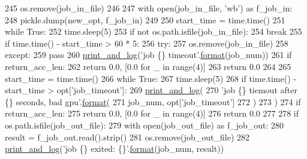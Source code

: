 \begin{DoxyCode}
245         os.remove(job\_in\_file)
246 
247     with open(job\_in\_file, \textcolor{stringliteral}{'wb'}) \textcolor{keyword}{as} f\_job\_in:
248         pickle.dump(new\_opt, f\_job\_in)
249 
250     start\_time = time.time()
251     \textcolor{keywordflow}{while} \textcolor{keyword}{True}:
252         time.sleep(5)
253         \textcolor{keywordflow}{if} \textcolor{keywordflow}{not} os.path.isfile(job\_in\_file):
254             \textcolor{keywordflow}{break}
255         \textcolor{keywordflow}{if} time.time() - start\_time > 60 * 5:
256             \textcolor{keywordflow}{try}:
257                 os.remove(job\_in\_file)
258             \textcolor{keywordflow}{except}:
259                 \textcolor{keywordflow}{pass}
260             \hyperlink{namespaceprojects_1_1mastering__the__dungeon_1_1mturk_1_1tasks_1_1MTD_1_1run_acdf4e0fae33f363cf0b352a72788f9bd}{print\_and\_log}(\textcolor{stringliteral}{'job \{\} timeout'}.\hyperlink{namespaceparlai_1_1chat__service_1_1services_1_1messenger_1_1shared__utils_a32e2e2022b824fbaf80c747160b52a76}{format}(job\_num))
261             \textcolor{keywordflow}{if} return\_acc\_len:
262                 \textcolor{keywordflow}{return} 0.0, [0.0 \textcolor{keywordflow}{for} \_ \textcolor{keywordflow}{in} range(4)]
263             \textcolor{keywordflow}{return} 0.0
264 
265     start\_time = time.time()
266     \textcolor{keywordflow}{while} \textcolor{keyword}{True}:
267         time.sleep(5)
268         \textcolor{keywordflow}{if} time.time() - start\_time > opt[\textcolor{stringliteral}{'job\_timeout'}]:
269             \hyperlink{namespaceprojects_1_1mastering__the__dungeon_1_1mturk_1_1tasks_1_1MTD_1_1run_acdf4e0fae33f363cf0b352a72788f9bd}{print\_and\_log}(
270                 \textcolor{stringliteral}{'job \{\} tiemout after \{\} seconds, bad gpu'}.\hyperlink{namespaceparlai_1_1chat__service_1_1services_1_1messenger_1_1shared__utils_a32e2e2022b824fbaf80c747160b52a76}{format}(
271                     job\_num, opt[\textcolor{stringliteral}{'job\_timeout'}]
272                 )
273             )
274             \textcolor{keywordflow}{if} return\_acc\_len:
275                 \textcolor{keywordflow}{return} 0.0, [0.0 \textcolor{keywordflow}{for} \_ \textcolor{keywordflow}{in} range(4)]
276             \textcolor{keywordflow}{return} 0.0
277 
278         \textcolor{keywordflow}{if} os.path.isfile(job\_out\_file):
279             with open(job\_out\_file) \textcolor{keyword}{as} f\_job\_out:
280                 result = f\_job\_out.read().strip()
281             os.remove(job\_out\_file)
282             \hyperlink{namespaceprojects_1_1mastering__the__dungeon_1_1mturk_1_1tasks_1_1MTD_1_1run_acdf4e0fae33f363cf0b352a72788f9bd}{print\_and\_log}(\textcolor{stringliteral}{'job \{\} exited: \{\}'}.\hyperlink{namespaceparlai_1_1chat__service_1_1services_1_1messenger_1_1shared__utils_a32e2e2022b824fbaf80c747160b52a76}{format}(job\_num, result))

\end{DoxyCode}

